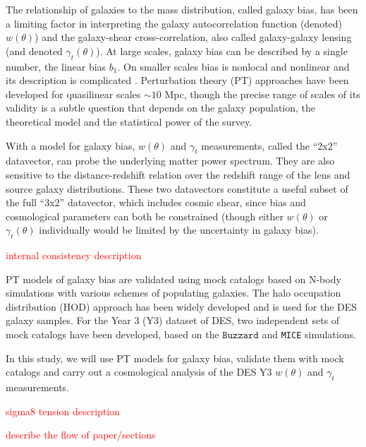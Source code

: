 \documentclass[fleqn,usenatbib]{mnras}
\newcommand{\mice}{\texttt{MICE} }
\newcommand{\buzzard}{\texttt{Buzzard} }
\newcommand{\red}[1]{\textcolor{red}{#1}}
\begin{document}
The relationship of galaxies to the mass distribution, called galaxy bias, has been a limiting factor in interpreting the galaxy autocorrelation function (denoted) $w(\theta)$) and the galaxy-shear cross-correlation, also called galaxy-galaxy lensing (and denoted $\gamma_t(\theta)$). At large scales, galaxy bias can be described by a single number, the linear bias $b_1$. On smaller scales bias is nonlocal and nonlinear and its description is complicated \citep{Fry_93,Scherrer_98}. Perturbation theory (PT) approaches have been developed for quasilinear scales $\sim 10$ Mpc, though the precise range of scales of its validity is a subtle question that depends on the galaxy population, the theoretical model and the statistical power of the survey. 

With a model for galaxy bias, $w(\theta)$ and $\gamma_t$ measurements, called the ``2x2'' datavector,   can probe the underlying matter power spectrum. They are also sensitive to the distance-redshift relation over the redshift range of the lens and source galaxy distributions.  These two datavectors constitute a useful subset of the full ``3x2'' datavector, which includes cosmic shear, since bias and cosmological parameters can both be constrained (though either $w(\theta)$ or $\gamma_t(\theta)$ individually would be limited by the uncertainty in galaxy bias). 

\red{internal consistency description}


PT models of galaxy bias are validated using mock catalogs based on N-body simulations with various schemes of populating galaxies. The halo occupation distribution (HOD) approach has been widely developed and is used for the DES galaxy samples. For the Year 3 (Y3) dataset of DES, two independent sets of mock catalogs have been developed, based on the $\buzzard$ and \mice simulations. 

In this study, we will use PT models for galaxy bias, validate them with mock catalogs and carry out a cosmological analysis of the DES Y3 $w(\theta)$ and $\gamma_t$ measurements.

\red{sigma8 tension description}


\red{describe the flow of paper/sections}
\end{document}
